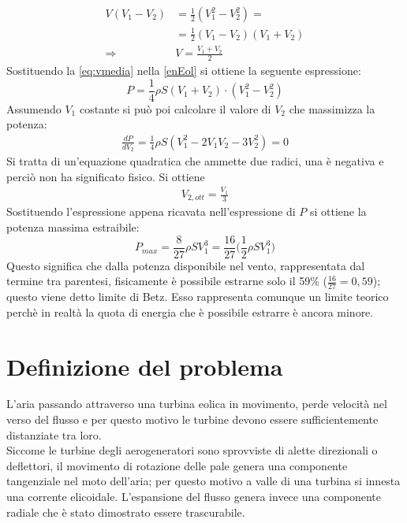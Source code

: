 \begin{align}
	V \left(V_1 - V_2 \right)& = \frac{1}{2} \left(V_1^2-V_2^2 \right) = \\
	& = \frac{1}{2} \left(V_1-V_2 \right)\left(V_1+V_2 \right) \\
	\Rightarrow & V = \frac{V_1 + V_2}{2}
	\label{eq:vmedia}
\end{align}
Sostituendo la \ref{eq:vmedia} nella \ref{enEol} si ottiene la seguente espressione:
\begin{equation}\label{eq:potfin}
P = \frac{1}{4} \rho S \left( V_1 +V_2 \right) \cdot \left(V_1^2 - V_2^2 \right)
\end{equation}
Assumendo $V_1$ costante si può poi calcolare il valore di $V_2$ che massimizza la potenza:
\begin{align*}
\frac{dP}{dV_2} = \frac{1}{4} \rho S \left( V_1^2 - 2 V_1 V_2 - 3 V_2^2 \right) = 0
\end{align*}
Si tratta di un'equazione quadratica che ammette due radici, una è negativa e perciò non ha significato fisico. Si ottiene
\begin{align*}
V_{2,ott} = \frac{V_1}{3}
\end{align*}
Sostituendo l'espressione appena ricavata nell'espressione di $P$ si ottiene la potenza massima estraibile:
\begin{equation}
\boxed{P_{max} = \frac{8}{27} \rho S V_1^3 = \frac{16}{27} \bigg(\frac{1}{2} \rho S V_1^3\bigg)}
\end{equation}
Questo significa che dalla potenza disponibile nel vento, rappresentata dal termine tra parentesi, fisicamente è possibile estrarne solo il 59\% ($\frac{16}{27}=0,59$); questo viene detto limite di Betz. Esso rappresenta comunque un limite teorico perchè in realtà la quota di energia che è possibile estrarre è ancora minore.

\section{Definizione del problema}
L'aria passando attraverso una turbina eolica in movimento, perde velocità nel verso del flusso e per questo motivo le turbine devono essere sufficientemente distanziate tra loro.\\
Siccome le turbine degli aerogeneratori sono sprovviste di alette direzionali o deflettori, il movimento di rotazione delle pale genera una componente tangenziale nel moto dell'aria; per questo motivo a valle di una turbina si innesta una corrente elicoidale. L'espansione del flusso genera invece una componente radiale che è stato dimostrato essere trascurabile. 

